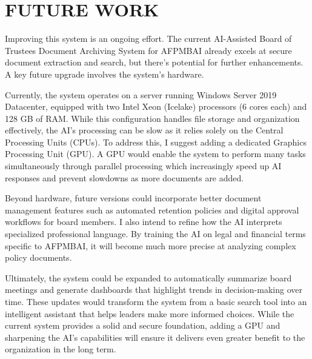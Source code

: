 
\section{FUTURE WORK}
    Improving this system is an ongoing effort. The current AI-Assisted Board of Trustees Document Archiving System for AFPMBAI already excels at secure document extraction and search, but there's potential for further enhancements. A key future upgrade involves the system's hardware.

Currently, the system operates on a server running Windows Server 2019 Datacenter, equipped with two Intel Xeon (Icelake) processors (6 cores each) and 128 GB of RAM. While this configuration handles file storage and organization effectively, the AI's processing can be slow as it relies solely on the Central Processing Units (CPUs). To address this, I suggest adding a dedicated Graphics Processing Unit (GPU). A GPU would enable the system to perform many tasks simultaneously through parallel processing which increasingly speed up AI responses and prevent slowdowns as more documents are added.

Beyond hardware, future versions could incorporate better document management features such as automated retention policies and digital approval workflows for board members. I also intend to refine how the AI interprets specialized professional language. By training the AI on legal and financial terms specific to AFPMBAI, it will become much more precise at analyzing complex policy documents.

Ultimately, the system could be expanded to automatically summarize board meetings and generate dashboards that highlight trends in decision-making over time. These updates would transform the system from a basic search tool into an intelligent assistant that helps leaders make more informed choices. While the current system provides a solid and secure foundation, adding a GPU and sharpening the AI's capabilities will ensure it delivers even greater benefit to the organization in the long term.